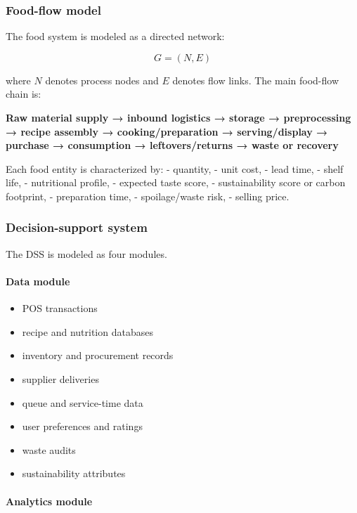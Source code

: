 \subsubsection{Food-flow model}\label{food-flow-model}

The food system is modeled as a directed network:

\[G = (N,E)\]

where \(N\) denotes process nodes and \(E\) denotes flow links. The main
food-flow chain is:

\textbf{Raw material supply → inbound logistics → storage →
preprocessing → recipe assembly → cooking/preparation → serving/display
→ purchase → consumption → leftovers/returns → waste or recovery}

Each food entity is characterized by: - quantity, - unit cost, - lead
time, - shelf life, - nutritional profile, - expected taste score, -
sustainability score or carbon footprint, - preparation time, -
spoilage/waste risk, - selling price.

\subsubsection{Decision-support system}\label{decision-support-system}

The DSS is modeled as four modules.

\paragraph{Data module}\label{data-module}

\begin{itemize}
\tightlist
\item
  POS transactions
\item
  recipe and nutrition databases
\item
  inventory and procurement records
\item
  supplier deliveries
\item
  queue and service-time data
\item
  user preferences and ratings
\item
  waste audits
\item
  sustainability attributes
\end{itemize}

\paragraph{Analytics module}\label{analytics-module}

